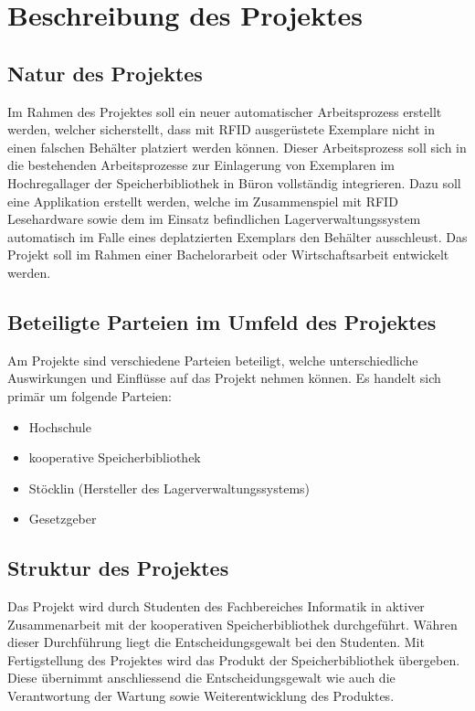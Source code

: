 \chapter{Beschreibung des Projektes}

\section{Natur des Projektes}
Im Rahmen des Projektes soll ein neuer automatischer Arbeitsprozess erstellt werden, welcher sicherstellt, dass mit RFID ausgerüstete Exemplare nicht in einen falschen Behälter platziert werden können. Dieser Arbeitsprozess soll sich in die bestehenden Arbeitsprozesse zur Einlagerung von Exemplaren im Hochregallager der Speicherbibliothek in Büron vollständig integrieren. Dazu soll eine Applikation erstellt werden, welche im Zusammenspiel mit RFID Lesehardware sowie dem im Einsatz befindlichen Lagerverwaltungssystem automatisch im Falle eines deplatzierten Exemplars den Behälter ausschleust. Das Projekt soll im Rahmen einer Bachelorarbeit oder Wirtschaftsarbeit entwickelt werden.

\section{Beteiligte Parteien im Umfeld des Projektes}
Am Projekte sind verschiedene Parteien beteiligt, welche unterschiedliche Auswirkungen und Einflüsse auf das Projekt nehmen können. Es handelt sich primär um folgende Parteien:
\begin{itemize}
	\item Hochschule
	\item kooperative Speicherbibliothek
	\item Stöcklin (Hersteller des Lagerverwaltungssystems)
	\item Gesetzgeber
\end{itemize}

\section{Struktur des Projektes}
Das Projekt wird durch Studenten des Fachbereiches Informatik in aktiver Zusammenarbeit mit der kooperativen Speicherbibliothek durchgeführt. Währen dieser Durchführung liegt die Entscheidungsgewalt bei den Studenten. Mit Fertigstellung des Projektes wird das Produkt der Speicherbibliothek übergeben. Diese übernimmt anschliessend die Entscheidungsgewalt wie auch die Verantwortung der Wartung sowie Weiterentwicklung des Produktes.

